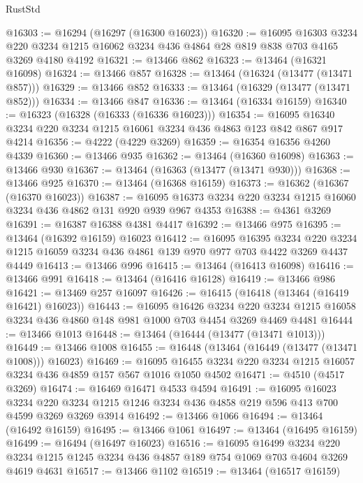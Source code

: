 \begin{lexlean}{RustStd}
\begin{coremodule}
@16303 := @16294 (@16297 (@16300 @16023))
@16320 := @16095
    @16303
    @3234
    @220
    @3234
    @1215
    @16062
    @3234
    @436
    @4864
    @28
    @819
    @838
    @703
    @4165
    @3269
    @4180
    @4192
@16321 := @13466 @862
@16323 := @13464 (@16321 @16098)
@16324 := @13466 @857
@16328 := @13464 (@16324 (@13477 (@13471 @857)))
@16329 := @13466 @852
@16333 := @13464 (@16329 (@13477 (@13471 @852)))
@16334 := @13466 @847
@16336 := @13464 (@16334 @16159)
@16340 := @16323 (@16328 (@16333 (@16336 @16023)))
@16354 := @16095 @16340 @3234 @220 @3234 @1215 @16061 @3234 @436 @4863 @123 @842 @867 @917 @4214
@16356 := @4222 (@4229 @3269)
@16359 := @16354 @16356 @4260 @4339
@16360 := @13466 @935
@16362 := @13464 (@16360 @16098)
@16363 := @13466 @930
@16367 := @13464 (@16363 (@13477 (@13471 @930)))
@16368 := @13466 @925
@16370 := @13464 (@16368 @16159)
@16373 := @16362 (@16367 (@16370 @16023))
@16387 := @16095 @16373 @3234 @220 @3234 @1215 @16060 @3234 @436 @4862 @131 @920 @939 @967 @4353
@16388 := @4361 @3269
@16391 := @16387 @16388 @4381 @4417
@16392 := @13466 @975
@16395 := @13464 (@16392 @16159) @16023
@16412 := @16095
    @16395
    @3234
    @220
    @3234
    @1215
    @16059
    @3234
    @436
    @4861
    @139
    @970
    @977
    @703
    @4422
    @3269
    @4437
    @4449
@16413 := @13466 @996
@16415 := @13464 (@16413 @16098)
@16416 := @13466 @991
@16418 := @13464 (@16416 @16128)
@16419 := @13466 @986
@16421 := @13469 @257 @16097
@16426 := @16415 (@16418 (@13464 (@16419 @16421) @16023))
@16443 := @16095
    @16426
    @3234
    @220
    @3234
    @1215
    @16058
    @3234
    @436
    @4860
    @148
    @981
    @1000
    @703
    @4454
    @3269
    @4469
    @4481
@16444 := @13466 @1013
@16448 := @13464 (@16444 (@13477 (@13471 @1013)))
@16449 := @13466 @1008
@16455 := @16448 (@13464 (@16449 (@13477 (@13471 @1008))) @16023)
@16469 := @16095 @16455 @3234 @220 @3234 @1215 @16057 @3234 @436 @4859 @157 @567 @1016 @1050 @4502
@16471 := @4510 (@4517 @3269)
@16474 := @16469 @16471 @4533 @4594
@16491 := @16095
    @16023
    @3234
    @220
    @3234
    @1215
    @1246
    @3234
    @436
    @4858
    @219
    @596
    @413
    @700
    @4599
    @3269
    @3269
    @3914
@16492 := @13466 @1066
@16494 := @13464 (@16492 @16159)
@16495 := @13466 @1061
@16497 := @13464 (@16495 @16159)
@16499 := @16494 (@16497 @16023)
@16516 := @16095
    @16499
    @3234
    @220
    @3234
    @1215
    @1245
    @3234
    @436
    @4857
    @189
    @754
    @1069
    @703
    @4604
    @3269
    @4619
    @4631
@16517 := @13466 @1102
@16519 := @13464 (@16517 @16159)

\end{coremodule}
\end{lexlean}
